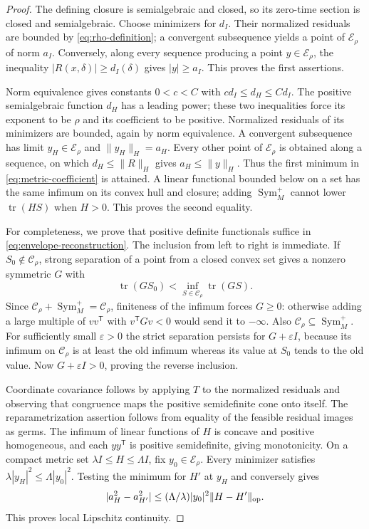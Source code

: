 \documentclass[11pt,reqno]{amsart}
\numberwithin{equation}{section}
\theoremstyle{definition}
\theoremstyle{remark}
\newcommand{\Sym}{\operatorname{Sym}}
\newcommand{\tr}{\operatorname{tr}}
\newcommand{\cE}{\mathcal E}
\newcommand{\cC}{\mathcal C}
\begin{document}
\begin{proof}
The defining closure is semialgebraic and closed, so its zero-time section is closed and semialgebraic. Choose minimizers for $d_I$. Their normalized residuals are bounded by \eqref{eq:rho-definition}; a convergent subsequence yields a point of $\cE_\rho$ of norm $a_I$. Conversely, along every sequence producing a point $y\in\cE_\rho$, the inequality $|R(x,\delta)|\ge d_I(\delta)$ gives $|y|\ge a_I$. This proves the first assertions.

Norm equivalence gives constants $0<c<C$ with $cd_I\le d_H\le Cd_I$. The positive semialgebraic function $d_H$ has a leading power; these two inequalities force its exponent to be $\rho$ and its coefficient to be positive. Normalized residuals of its minimizers are bounded, again by norm equivalence. A convergent subsequence has limit $y_H\in\cE_\rho$ and $\|y_H\|_H=a_H$. Every other point of $\cE_\rho$ is obtained along a sequence, on which $d_H\le\|R\|_H$ gives $a_H\le\|y\|_H$. Thus the first minimum in \eqref{eq:metric-coefficient} is attained. A linear functional bounded below on a set has the same infimum on its convex hull and closure; adding $\Sym_M^+$ cannot lower $\tr(HS)$ when $H>0$. This proves the second equality.

For completeness, we prove that positive definite functionals suffice in \eqref{eq:envelope-reconstruction}. The inclusion from left to right is immediate. If $S_0\notin\cC_\rho$, strong separation of a point from a closed convex set gives a nonzero symmetric $G$ with
\[
 \tr(GS_0)<\inf_{S\in\cC_\rho}\tr(GS).
\]
Since $\cC_\rho+\Sym_M^+=\cC_\rho$, finiteness of the infimum forces $G\ge0$: otherwise adding a large multiple of $vv^{\mathsf T}$ with $v^{\mathsf T}Gv<0$ would send it to $-\infty$. Also $\cC_\rho\subseteq\Sym_M^+$. For sufficiently small $\varepsilon>0$ the strict separation persists for $G+\varepsilon I$, because its infimum on $\cC_\rho$ is at least the old infimum whereas its value at $S_0$ tends to the old value. Now $G+\varepsilon I>0$, proving the reverse inclusion.

Coordinate covariance follows by applying $T$ to the normalized residuals and observing that congruence maps the positive semidefinite cone onto itself. The reparametrization assertion follows from equality of the feasible residual images as germs. The infimum of linear functions of $H$ is concave and positive homogeneous, and each $yy^{\mathsf T}$ is positive semidefinite, giving monotonicity. On a compact metric set $\lambda I\le H\le\Lambda I$, fix $y_0\in\cE_\rho$. Every minimizer satisfies $\lambda|y_H|^2\le\Lambda|y_0|^2$. Testing the minimum for $H'$ at $y_H$ and conversely gives
\[
 |a_H^2-a_{H'}^2|\le(\Lambda/\lambda)|y_0|^2\|H-H'\|_{\rm op}.
\]
This proves local Lipschitz continuity.
\end{proof}
\end{document}

